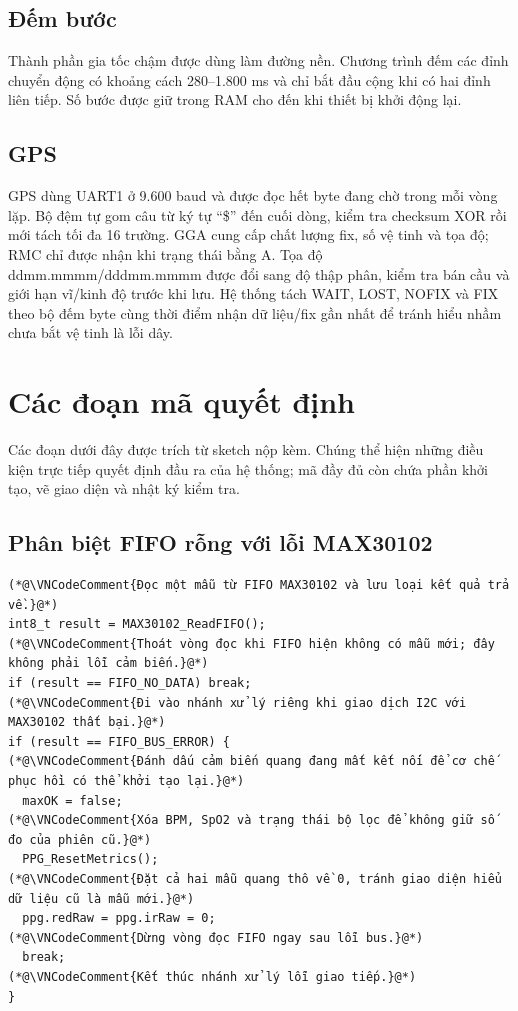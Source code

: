 \documentclass[12pt]{article}
\begin{document}
\subsection{Đếm bước}

Thành phần gia tốc chậm được dùng làm đường nền. Chương trình đếm các đỉnh chuyển động có khoảng cách 280--1.800 ms và chỉ bắt đầu cộng khi có hai đỉnh liên tiếp. Số bước được giữ trong RAM cho đến khi thiết bị khởi động lại.

\subsection{GPS}

GPS dùng UART1 ở 9.600 baud và được đọc hết byte đang chờ trong mỗi vòng lặp. Bộ đệm tự gom câu từ ký tự ``\$'' đến cuối dòng, kiểm tra checksum XOR rồi mới tách tối đa 16 trường. GGA cung cấp chất lượng fix, số vệ tinh và tọa độ; RMC chỉ được nhận khi trạng thái bằng A. Tọa độ ddmm.mmmm/dddmm.mmmm được đổi sang độ thập phân, kiểm tra bán cầu và giới hạn vĩ/kinh độ trước khi lưu. Hệ thống tách WAIT, LOST, NOFIX và FIX theo bộ đếm byte cùng thời điểm nhận dữ liệu/fix gần nhất để tránh hiểu nhầm chưa bắt vệ tinh là lỗi dây.

\section{Các đoạn mã quyết định}

Các đoạn dưới đây được trích từ sketch nộp kèm. Chúng thể hiện những điều kiện trực tiếp quyết định đầu ra của hệ thống; mã đầy đủ còn chứa phần khởi tạo, vẽ giao diện và nhật ký kiểm tra.

\subsection{Phân biệt FIFO rỗng với lỗi MAX30102}

\Needspace{0.28\textheight}
\begin{lstlisting}[style=firmware,caption={Không dùng dữ liệu PPG cũ khi cảm biến mất kết nối}]
(*@\VNCodeComment{Đọc một mẫu từ FIFO MAX30102 và lưu loại kết quả trả về.}@*)
int8_t result = MAX30102_ReadFIFO();
(*@\VNCodeComment{Thoát vòng đọc khi FIFO hiện không có mẫu mới; đây không phải lỗi cảm biến.}@*)
if (result == FIFO_NO_DATA) break;
(*@\VNCodeComment{Đi vào nhánh xử lý riêng khi giao dịch I2C với MAX30102 thất bại.}@*)
if (result == FIFO_BUS_ERROR) {
(*@\VNCodeComment{Đánh dấu cảm biến quang đang mất kết nối để cơ chế phục hồi có thể khởi tạo lại.}@*)
  maxOK = false;
(*@\VNCodeComment{Xóa BPM, SpO2 và trạng thái bộ lọc để không giữ số đo của phiên cũ.}@*)
  PPG_ResetMetrics();
(*@\VNCodeComment{Đặt cả hai mẫu quang thô về 0, tránh giao diện hiểu dữ liệu cũ là mẫu mới.}@*)
  ppg.redRaw = ppg.irRaw = 0;
(*@\VNCodeComment{Dừng vòng đọc FIFO ngay sau lỗi bus.}@*)
  break;
(*@\VNCodeComment{Kết thúc nhánh xử lý lỗi giao tiếp.}@*)
}
\end{lstlisting}
\end{document}
